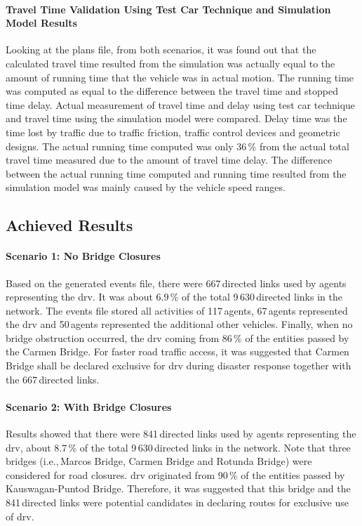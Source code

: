 \paragraph{Travel Time Validation Using Test Car Technique and Simulation Model Results}
Looking at the plans file, from both scenarios, it was found out that the calculated travel time resulted from the simulation was actually equal to the amount of running time that the vehicle was in actual motion. The running time was computed as equal to the difference between the travel time and stopped time delay. Actual measurement of travel time and delay using test car technique \citep[][]{Sigua_2008} and travel time using the simulation model were compared. Delay time was the time lost by traffic due to traffic friction, traffic control devices and geometric designs. The actual running time computed was only 36\,\% from the actual total travel time measured due to the amount of travel time delay. The difference between the actual running time computed and running time resulted from the simulation model was mainly caused by the vehicle speed ranges. 

\subsection{Achieved Results}
\paragraph{Scenario 1: No Bridge Closures}
Based on the generated events file, there were 667\,directed links used by agents representing the \gls{drv}. It was about 6.9\,\% of the total 9\,630\,directed links in the network. The events file stored all activities of 117\,agents, 67\,agents represented the \gls{drv} and 50\,agents represented the additional other vehicles. Finally, when no bridge obstruction occurred, the \gls{drv} coming from 86\,\% of the entities passed by the Carmen Bridge. For faster road traffic access, it was suggested that Carmen Bridge shall be declared exclusive for \gls{drv} during disaster response together with the 667\,directed links.

\paragraph{Scenario 2: With Bridge Closures}
Results showed that there were 841\,directed links used by agents representing the \gls{drv}, about 8.7\,\% of the total 9\,630\,directed links in the network. Note that three bridges (i.e.,\,Marcos Bridge, Carmen Bridge and Rotunda Bridge) were considered for road closures. \gls{drv} originated from 90\,\% of the entities passed by Kauswagan-Puntod Bridge. Therefore, it was suggested that this bridge and the 841\,directed links were potential candidates in declaring routes for exclusive use of \gls{drv}.

